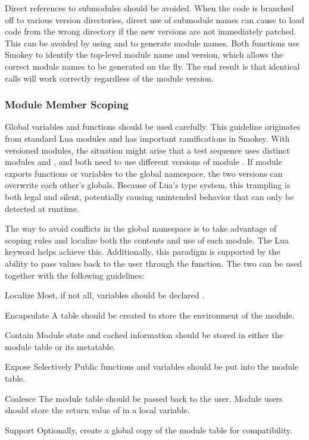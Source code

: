 Direct references to submodules should be avoided.  When the 
code is branched off to various version directories, direct use of submodule
names can cause  to load code from the wrong directory if the
new versions are not immediately patched.  This can be avoided by using
 and  to generate module names.  Both
functions use Smokey to identify the top-level module name and version, which
allows the correct module names to be generated on the fly.  The end result is
that identical  calls will work correctly regardless of the
module version.

\subsubsection{Module Member Scoping}

Global variables and functions should be used carefully.  This guideline
originates from standard Lua modules and has important ramifications in Smokey.
With versioned modules, the situation might arise that a test sequence uses
distinct modules  and , and both need to use different
versions of module .  If module  exports functions or
variables to the global namespace, the two versions can overwrite each other's
globals.  Because of Lua's type system, this trampling is both legal and
silent, potentially causing unintended behavior that can only be detected at
runtime.  

The way to avoid conflicts in the global namespace is to take advantage of
scoping rules and localize both the contents and use of each module.  The Lua
 keyword helps achieve this.  Additionally, this paradigm is
supported by the ability to pass values back to the user through the
 function.  The two can be used together with the following
guidelines:

\begin{Descriptive}

	\item[Localize] Most, if not all, variables should be declared
	.

	\item[Encapsulate] A table should be created to store the environment
	of the module.

	\item[Contain] Module state and cached information should be stored in
	either the module table or its metatable.

	\item[Expose Selectively] Public functions and variables should be put
	into the module table.

	\item[Coalesce] The module table should be passed back to the user.
	Module users should store the return value of  in a
	local variable.

	\item[Support] Optionally, create a global copy of the module table for
	compatibility.

\end{Descriptive}

